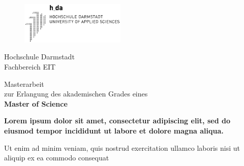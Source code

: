 \begin{titlepage}
  \thispagestyle{empty}
  
    \begin{center}
  
        \begin{figure}[t]
            \centering
            \includegraphics[width=5cm]{resources/img/logo_hda.png}
        \end{figure}
  
        \vspace{0.5cm}

        \begin{large}
          Hochschule Darmstadt\\
          Fachbereich EIT
  
          \vspace{0.7cm}
  
          Masterarbeit\\
          zur Erlangung des akademischen Grades eines\\
          \vspace{0.2cm}
          \textbf{Master of Science}
        \end{large}
  
        \vspace{0.75cm}
  
        \begin{large}
          \textbf{Lorem ipsum dolor sit amet, consectetur adipiscing elit, sed do eiusmod tempor incididunt ut labore et dolore magna aliqua.}\\
        \end{large}
  
        \vspace{0.25cm}
  
        \begin{large}
          Ut enim ad minim veniam, quis nostrud exercitation ullamco laboris nisi ut aliquip ex ea commodo consequat\\
        \end{large}
  
        \vspace{0.75cm}
  

\end{center}
\end{titlepage}

